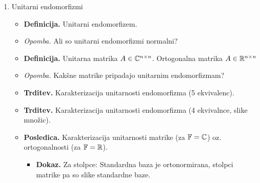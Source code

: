 \begin{enumerate}
    \item Unitarni endomorfizmi
    \begin{itemize}
        \item \colorbox{purple!30}{\textbf{Definicija.}} Unitarni endomorfizem.
        \item \colorbox{yellow!30}{\emph{Opomba.}} Ali so unitarni endomorfizmi normalni?
        \item \colorbox{purple!30}{\textbf{Definicija.}} Unitarna matrika $A \in \mathbb{C}^{n \times n}$. Ortogonalna matrika $A \in \mathbb{R}^{n \times n}$
        \item \colorbox{yellow!30}{\emph{Opomba.}} Kakšne matrike pripadajo unitarnim endomorfizmam?
        \item \colorbox{blue!30}{\textbf{Trditev.}} Karakterizacija unitarnosti endomorfizma (5 ekvivalenc).
        \item \colorbox{blue!30}{\textbf{Trditev.}} Karakterizacija unitarnosti endomorfizma (4 ekvivalnce, slike množic).
        \item \colorbox{orange!30}{\textbf{Posledica.}} Karakterizacija unitarnosti matrike (za $\mathbb{F} = \mathbb{C}$) oz. ortogonalnosti (za $\mathbb{F} = \mathbb{R}$).
        \begin{itemize}
            \item \colorbox{green!30}{\textbf{Dokaz.}} Za stolpce: Standardna baza je ortonormirana, stolpci matrike pa so slike standardne baze.
            

\end{itemize}
\end{itemize}
\end{enumerate}
